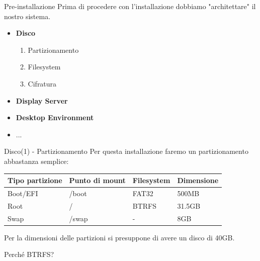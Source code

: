 \begin{frame}{Pre-installazione}
    Prima di procedere con l'installazione dobbiamo "architettare"
    il nostro sistema.
    \begin{itemize}
        \item \textbf{Disco}
        \begin{enumerate}
            \item Partizionamento
            \item Filesystem
            \item Cifratura
        \end{enumerate}
        \item \textbf{Display Server}
        \item \textbf{Desktop Environment}
        \item ...
    \end{itemize}
\end{frame}
\begin{frame}{Disco(1) - Partizionamento}
Per questa installazione faremo un partizionamento abbastanza semplice:
\vspace{20pt}
\begin{center}
    \begin{tabular}{ | m{7em} | m{8em} | m{5em}| m{5em} | } 
        \hline
        \textbf{Tipo partizione} & \textbf{Punto di mount} & \textbf{Filesystem} & \textbf{Dimensione} \\ 
        \hline
        Boot/EFI & /boot & FAT32 & 500MB \\ 
        \hline
        Root & / & BTRFS & 31.5GB \\ 
        \hline
        Swap & /swap & - & 8GB \\
        \hline
    \end{tabular}
\end{center}
\vspace{20pt}
Per la dimensioni delle partizioni si presuppone di avere un disco di 40GB.
\end{frame}


\begin{frame}{Perché BTRFS?}

\end{frame}


